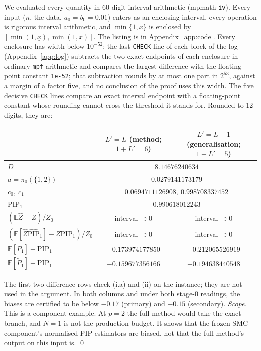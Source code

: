 \documentclass[11pt]{article}
\theoremstyle{remark}
\newcommand{\E}{\mathbb{E}}
\newcommand{\Zh}{\widehat Z}
\newcommand{\PIPh}{\widehat{\mathrm{PIP}}}
\newcommand{\PIP}{\mathrm{PIP}}
\begin{document}
We evaluated every quantity in 60-digit interval arithmetic (mpmath \texttt{iv}). Every input ($n$, the data, $a_0=b_0=0.01$) enters as an enclosing interval, every operation is rigorous interval arithmetic, and $\min\{1,x\}$ is enclosed by $[\min(1,\underline x),\min(1,\overline x)]$. The listing is in Appendix~\ref{app:code}. Every enclosure has width below $10^{-52}$: the last \texttt{CHECK} line of each block of the log (Appendix~\ref{app:log}) subtracts the two exact endpoints of each enclosure in ordinary \texttt{mpf} arithmetic and compares the largest difference with the floating-point constant \texttt{1e-52}; that subtraction rounds by at most one part in $2^{53}$, against a margin of a factor five, and no conclusion of the proof uses this width. The five decisive \texttt{CHECK} lines compare an exact interval endpoint with a floating-point constant whose rounding cannot cross the threshold it stands for. Rounded to 12 digits, they are:
\begin{center}
\begin{tabular}{lcc}
 & $L'=L$ (method; $1+L'=6$) & $L'=L-1$ (generalisation; $1+L'=5$)\\\hline
$D$ & \multicolumn{2}{c}{$8.14676240634$}\\
$a=\pi_0(\{1,2\})$ & \multicolumn{2}{c}{$0.0279141173179$}\\
$c_0,\ c_1$ & \multicolumn{2}{c}{$0.0694711126908,\ 0.998708337452$}\\
$\PIP_1$ & \multicolumn{2}{c}{$0.990618012243$}\\
$(\E\Zh-Z)/Z_0$ & interval $\ni0$ & interval $\ni0$\\
$(\E[\Zh\PIPh_1]-Z\PIP_1)/Z_0$ & interval $\ni0$ & interval $\ni0$\\
$\E[\bar P_1]-\PIP_1$ & $-0.173974177850$ & $-0.212065526919$\\
$\E[\tilde P_1]-\PIP_1$ & $-0.159677356166$ & $-0.194638440548$\\
\end{tabular}
\end{center}
The first two difference rows check (i.a) and (ii) on the instance; they are not used in the argument. In both columns and under both stage-0 readings, the biases are certified to be below $-0.17$ (primary) and $-0.15$ (secondary). \emph{Scope.} This is a component example. At $p=2$ the full method would take the exact branch, and $N=1$ is not the production budget. It shows that the frozen SMC component's normalised PIP estimators are biased, not that the full method's output on this input is. \qed
\end{document}

